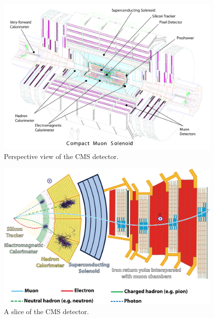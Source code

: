 
\begin{figure}\centering
\includegraphics[width=.9\textwidth]{figs/cms/Figure_001-002.pdf}
\caption{Perspective view of the CMS detector.\label{fig:CMSperspective}}
\end{figure}

\begin{figure}\centering
\includegraphics[width=.9\textwidth]{figs/cms/CMSslice_whiteBackground.png}
\caption{A slice of the CMS detector.\label{fig:CMSslice}}
\end{figure}


